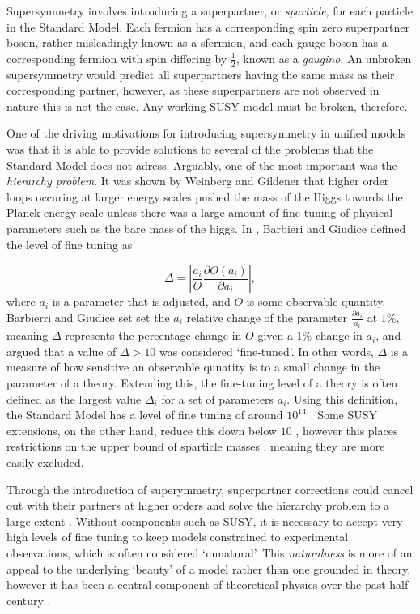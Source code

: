 \documentclass{article}
\begin{document}
Supersymmetry involves introducing a superpartner, or \textit{sparticle}, for each particle in the Standard Model. Each fermion has a corresponding spin zero superpartner boson, rather misleadingly known as a sfermion, and each gauge boson has a corresponding fermion with spin differing by $\frac{1}{2}$, known as a \textit{gaugino}. An unbroken supersymmetry would predict all superpartners having the same mass as their corresponding partner, however, as these superpartners are not observed in nature this is not the case. Any working SUSY model must be broken, therefore.

One of the driving motivations for introducing supersymmetry in unified models was that it is able to provide solutions to several of the problems that the Standard Model does not adress. Arguably, one of the most important was the \textit{hierarchy problem}. It was shown by Weinberg \cite{HierarchyProblem1} and Gildener \cite{HierarchyProblem2} that higher order loops occuring at larger energy scales pushed the mass of the Higgs towards the Planck energy scale unless there was a large amount of fine tuning of physical parameters such as the bare mass of the higgs. In \cite{FineTuningEqn}, Barbieri and Giudice defined the level of fine tuning as

\begin{equation}
\label{eqn:fineTuning}
\Delta = \left\vert \frac{a_i}{O} \frac{\partial O(a_i)}{\partial a_i} \right\vert,
\end{equation}
where $a_i$ is a parameter that is adjusted, and $O$ is some observable quantity. Barbierri and Giudice set set the $a_i$ relative change of the parameter $\frac{\partial a_i}{a_i}$ at $1$\%, meaning $\Delta$ represents the percentage change in $O$ given a $1$\% change in $a_i$, and argued that a value of $\Delta>10$ was considered `fine-tuned'. In other words, $\Delta$ is a measure of how sensitive an observable qunatity is to a small change in the parameter of a theory. Extending this, the fine-tuning level of a theory is often defined as the largest value $\Delta_i$ for a set of parameters $a_i$. Using this definition, the Standard Model has a level of fine tuning of around $10^{14}$ \cite{SO10_2}. Some SUSY extensions, on the other hand, reduce this down below $10$ \cite{FineTuningEqn}, however this places restrictions on the upper bound of sparticle masses \cite{LowESUSY}, meaning they are more easily excluded.

Through the introduction of superymmetry, superpartner corrections could cancel out with their partners at higher orders and solve the hierarchy problem to a large extent \cite{SUSYHierarchyProblem}. Without components such as SUSY, it is necessary to accept very high levels of fine tuning to keep models constrained to experimental observations, which is often considered `unnatural'. This \textit{naturalness} is more of an appeal to the underlying `beauty' of a model rather than one grounded in theory, however it has been a central component of theoretical physics over the past half-century \cite{Naturalness}.
\end{document}
